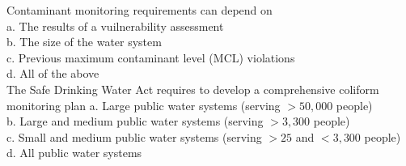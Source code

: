 Contaminant monitoring requirements can depend on\\
a. The results of a vuilnerability assessment\\
b. The size of the water system\\
c. Previous maximum contaminant level (MCL) violations\\
d. All of the above\\

The Safe Drinking Water Act requires to develop a comprehensive coliform monitoring plan
a. Large public water systems (serving $>50,000$ people)\\
b. Large and medium public water systems (serving $>3,300$ people)\\
c. Small and medium public water systems (serving $>25$ and $<3,300$ people)\\
d. All public water systems\\








